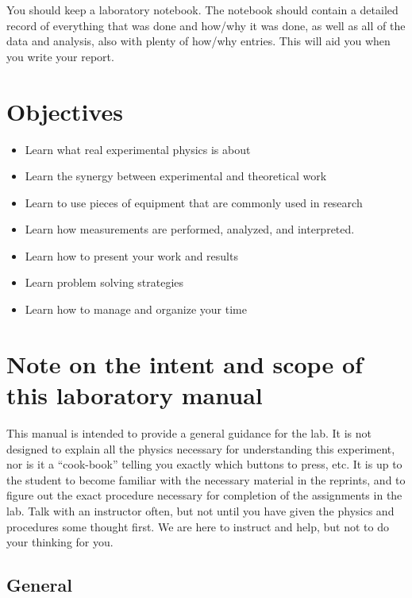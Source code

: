 \documentclass{../lab}
\begin{document}
You should keep a laboratory notebook. The notebook should contain a detailed record of everything that was done and how/why it was done, as well as all of the data and analysis, also with plenty of how/why entries. This will aid you when you write your report.

\section{Objectives}

\begin{itemize}
    \item Learn what real experimental physics is about

    \item Learn the synergy between experimental and theoretical work

    \item Learn to use pieces of equipment that are commonly used in research

    \item Learn how measurements are performed, analyzed, and interpreted.

    \item Learn how to present your work and results

    \item Learn problem solving strategies

    \item Learn how to manage and organize your time

\end{itemize}

\section{Note on the intent and scope of this laboratory manual}

This manual is intended to provide a general guidance for the lab. It is not designed to explain all the physics necessary for understanding this experiment, nor is it a ``cook-book'' telling you exactly which buttons to press, etc. It is up to the student to become familiar with the necessary material in the reprints, and to figure out the exact procedure necessary for completion of the assignments in the lab. Talk with an instructor often, but not until you have given the physics and procedures some thought first. We are here to instruct and help, but not to do your thinking for you.

\subsection{General}
\end{document}
